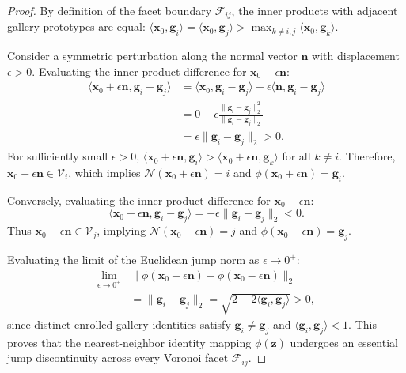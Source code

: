 \documentclass[conference]{IEEEtran}
\begin{document}
\begin{proof}
By definition of the facet boundary $\mathcal{F}_{ij}$, the inner products with adjacent gallery prototypes are equal: $\langle \mathbf{x}_0, \mathbf{g}_i \rangle = \langle \mathbf{x}_0, \mathbf{g}_j \rangle > \max_{k \neq i,j} \langle \mathbf{x}_0, \mathbf{g}_k \rangle$. 

Consider a symmetric perturbation along the normal vector $\mathbf{n}$ with displacement $\epsilon > 0$. Evaluating the inner product difference for $\mathbf{x}_0 + \epsilon \mathbf{n}$:
\begin{align}
\langle \mathbf{x}_0 + \epsilon \mathbf{n}, \mathbf{g}_i - \mathbf{g}_j \rangle &= \langle \mathbf{x}_0, \mathbf{g}_i - \mathbf{g}_j \rangle + \epsilon \langle \mathbf{n}, \mathbf{g}_i - \mathbf{g}_j \rangle \nonumber \\
&= 0 + \epsilon \frac{\|\mathbf{g}_i - \mathbf{g}_j\|_2^2}{\|\mathbf{g}_i - \mathbf{g}_j\|_2} \nonumber \\
&= \epsilon \|\mathbf{g}_i - \mathbf{g}_j\|_2 > 0.
\end{align}
For sufficiently small $\epsilon > 0$, $\langle \mathbf{x}_0 + \epsilon \mathbf{n}, \mathbf{g}_i \rangle > \langle \mathbf{x}_0 + \epsilon \mathbf{n}, \mathbf{g}_k \rangle$ for all $k \neq i$. Therefore, $\mathbf{x}_0 + \epsilon \mathbf{n} \in \mathcal{V}_i$, which implies $\mathcal{N}(\mathbf{x}_0 + \epsilon \mathbf{n}) = i$ and $\phi(\mathbf{x}_0 + \epsilon \mathbf{n}) = \mathbf{g}_i$.

Conversely, evaluating the inner product difference for $\mathbf{x}_0 - \epsilon \mathbf{n}$:
\begin{equation}
\langle \mathbf{x}_0 - \epsilon \mathbf{n}, \mathbf{g}_i - \mathbf{g}_j \rangle = -\epsilon \|\mathbf{g}_i - \mathbf{g}_j\|_2 < 0.
\end{equation}
Thus $\mathbf{x}_0 - \epsilon \mathbf{n} \in \mathcal{V}_j$, implying $\mathcal{N}(\mathbf{x}_0 - \epsilon \mathbf{n}) = j$ and $\phi(\mathbf{x}_0 - \epsilon \mathbf{n}) = \mathbf{g}_j$.

Evaluating the limit of the Euclidean jump norm as $\epsilon \to 0^+$:
\begin{align}
\lim_{\epsilon \to 0^+} &\|\phi(\mathbf{x}_0 + \epsilon \mathbf{n}) - \phi(\mathbf{x}_0 - \epsilon \mathbf{n})\|_2 \nonumber \\
&= \|\mathbf{g}_i - \mathbf{g}_j\|_2 = \sqrt{2 - 2\langle \mathbf{g}_i, \mathbf{g}_j \rangle} > 0,
\end{align}
since distinct enrolled gallery identities satisfy $\mathbf{g}_i \neq \mathbf{g}_j$ and $\langle \mathbf{g}_i, \mathbf{g}_j \rangle < 1$. This proves that the nearest-neighbor identity mapping $\phi(\mathbf{z})$ undergoes an essential jump discontinuity across every Voronoi facet $\mathcal{F}_{ij}$.
\end{proof}
\end{document}
